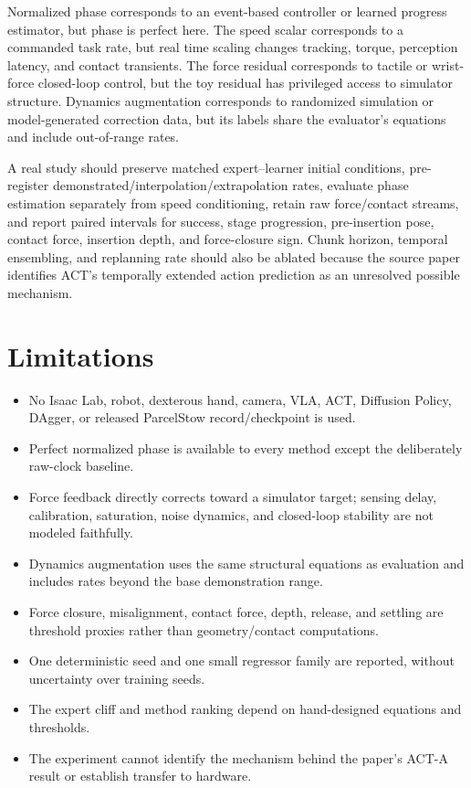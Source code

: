 \documentclass[11pt]{article}
\begin{document}
Normalized phase corresponds to an event-based controller or learned progress estimator, but phase is perfect here. The speed scalar corresponds to a commanded task rate, but real time scaling changes tracking, torque, perception latency, and contact transients. The force residual corresponds to tactile or wrist-force closed-loop control, but the toy residual has privileged access to simulator structure. Dynamics augmentation corresponds to randomized simulation or model-generated correction data, but its labels share the evaluator's equations and include out-of-range rates.

A real study should preserve matched expert--learner initial conditions, pre-register demonstrated/interpolation/extrapolation rates, evaluate phase estimation separately from speed conditioning, retain raw force/contact streams, and report paired intervals for success, stage progression, pre-insertion pose, contact force, insertion depth, and force-closure sign. Chunk horizon, temporal ensembling, and replanning rate should also be ablated because the source paper identifies ACT's temporally extended action prediction as an unresolved possible mechanism.

\section{Limitations}

\begin{itemize}[leftmargin=1.5em]
\item No Isaac Lab, robot, dexterous hand, camera, VLA, ACT, Diffusion Policy, DAgger, or released ParcelStow record/checkpoint is used.
\item Perfect normalized phase is available to every method except the deliberately raw-clock baseline.
\item Force feedback directly corrects toward a simulator target; sensing delay, calibration, saturation, noise dynamics, and closed-loop stability are not modeled faithfully.
\item Dynamics augmentation uses the same structural equations as evaluation and includes rates beyond the base demonstration range.
\item Force closure, misalignment, contact force, depth, release, and settling are threshold proxies rather than geometry/contact computations.
\item One deterministic seed and one small regressor family are reported, without uncertainty over training seeds.
\item The expert cliff and method ranking depend on hand-designed equations and thresholds.
\item The experiment cannot identify the mechanism behind the paper's ACT-A result or establish transfer to hardware.
\end{itemize}
\end{document}
